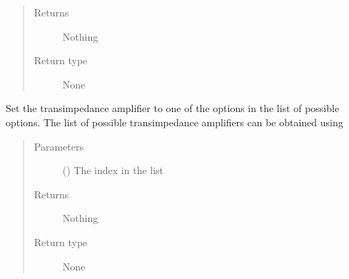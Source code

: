 \documentclass[letterpaper,10pt,english]{sphinxmanual}
\begin{document}
\begin{fulllineitems}
\begin{fulllineitems}
\begin{quote}
\begin{description}
\item[{Returns}] \leavevmode
\sphinxAtStartPar
Nothing

\item[{Return type}] \leavevmode
\sphinxAtStartPar
None

\end{description}\end{quote}

\end{fulllineitems}


\begin{fulllineitems}
\label{\detokenize{index:TiePieLCR_settings.TiePieLCR_settings.set_reference}}
\sphinxAtStartPar
Set the transimpedance amplifier to one of the options in the list of possible options. The list of possible transimpedance amplifiers can be obtained using {\hyperref[\detokenize{index:TiePieLCR_settings.TiePieLCR_settings.get_reference_name_list}]{}}
\begin{quote}\begin{description}
\item[{Parameters}] \leavevmode
\sphinxAtStartPar
{} () \textendash{} The index in the list

\item[{Returns}] \leavevmode
\sphinxAtStartPar
Nothing

\item[{Return type}] \leavevmode
\sphinxAtStartPar
None

\end{description}\end{quote}

\end{fulllineitems}



\end{fulllineitems}
\end{document}
